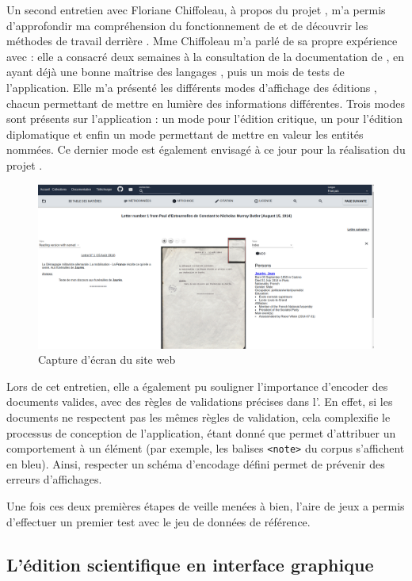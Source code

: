 Un second entretien avec Floriane Chiffoleau, à propos du projet \disco, m'a permis d'approfondir ma compréhension du fonctionnement de \tp et de découvrir les méthodes de travail derrière \disco. Mme Chiffoleau m'a parlé de sa propre expérience avec \tp : elle a consacré deux semaines à la consultation de la documentation de \tp, en ayant déjà une bonne maîtrise des langages \XML, puis un mois de tests de l'application. Elle m'a présenté les différents modes d'affichage des éditions \disco, chacun permettant de mettre en lumière des informations différentes. Trois modes sont présents sur l'application \disco : un mode pour l'édition critique, un pour l'édition diplomatique et enfin un mode permettant de mettre en valeur les entités nommées. Ce dernier mode est également envisagé à ce jour pour la réalisation du projet \COREL. 

\begin{figure}[h]
    \centering
    \includegraphics[width=\textwidth]{images/discholed.png}
    \caption{Capture d'écran du site web \disco}
\end{figure}

Lors de cet entretien, elle a également pu souligner l'importance d'encoder des documents \TEI valides, avec des règles de validations précises dans l'\ODD. En effet, si les documents ne respectent pas les mêmes règles de validation, cela complexifie le processus de conception de l'application, étant donné que \tp permet d'attribuer un comportement à un élément (par exemple, les balises \texttt{<note>} du corpus \COREL s'affichent en bleu). Ainsi, respecter un schéma d'encodage défini permet de prévenir des erreurs d'affichages. 

Une fois ces deux premières étapes de veille menées à bien, l'aire de jeux \tp a permis d'effectuer un premier test avec le jeu de données \TEI de référence. 

\subsection{L’édition scientifique en interface graphique}

